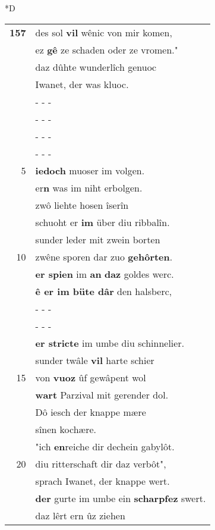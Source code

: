 \documentclass[8pt,a4paper,notitlepage]{article}
\begin{document}
\begin{table}[ht]
\begin{minipage}[t]{0.5\linewidth}
\small
\begin{center}*D
\end{center}
\begin{tabular}{rl}
\textbf{157} & des sol \textbf{vil} wênic von mir komen,\\ 
 & ez \textbf{gê} ze schaden oder ze vromen."\\ 
 & daz dûhte wunderlîch genuoc\\ 
 & Iwanet, der was kluoc.\\ 
 & \multicolumn{1}{l}{ - - - }\\ 
 & \multicolumn{1}{l}{ - - - }\\ 
 & \multicolumn{1}{l}{ - - - }\\ 
 & \multicolumn{1}{l}{ - - - }\\ 
5 & \textbf{iedoch} muoser im volgen.\\ 
 & er\textbf{n} was im niht erbolgen.\\ 
 & zwô liehte hosen îserîn\\ 
 & schuoht er \textbf{im} über diu ribbalîn.\\ 
 & sunder leder mit zwein borten\\ 
10 & zwêne sporen dar zuo \textbf{gehôrten}.\\ 
 & \textbf{er spien} im \textbf{an} \textbf{daz} goldes werc.\\ 
 & \textbf{ê er im büte dâr} den halsberc,\\ 
 & \multicolumn{1}{l}{ - - - }\\ 
 & \multicolumn{1}{l}{ - - - }\\ 
 & \textbf{er stricte} im umbe diu schinnelier.\\ 
 & sunder twâle \textbf{vil} harte schier\\ 
15 & von \textbf{vuoz} ûf gewâpent wol\\ 
 & \textbf{wart} Parzival mit gerender dol.\\ 
 & Dô iesch der knappe mære\\ 
 & sînen kochære.\\ 
 & "ich \textbf{en}reiche dir dechein gabylôt.\\ 
20 & diu ritterschaft dir daz verbôt",\\ 
 & sprach Iwanet, der knappe wert.\\ 
 & \textbf{der} gurte im umbe ein \textbf{scharpfez} swert.\\ 
 & daz lêrt ern ûz ziehen\\ 

\end{tabular}
\end{minipage}
\end{table}
\end{document}
